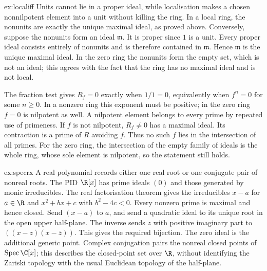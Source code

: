 \begin{solution}{ex:localiff}
\idea Units cannot lie in a proper ideal, while localisation makes a chosen nonnilpotent element into a unit without killing the ring.
\writeup In a local ring, the nonunits are exactly the unique maximal ideal, as proved above. Conversely, suppose the nonunits form an ideal $\mathfrak m$. It is proper since $1$ is a unit. Every proper ideal consists entirely of nonunits and is therefore contained in $\mathfrak m$. Hence $\mathfrak m$ is the unique maximal ideal. In the zero ring the nonunits form the empty set, which is not an ideal; this agrees with the fact that the ring has no maximal ideal and is not local.

The fraction test gives $R_f=0$ exactly when $1/1=0$, equivalently when $f^n=0$ for some $n\ge0$. In a nonzero ring this exponent must be positive; in the zero ring $f=0$ is nilpotent as well. A nilpotent element belongs to every prime by repeated use of primeness. If $f$ is not nilpotent, $R_f\ne0$ has a maximal ideal. Its contraction is a prime of $R$ avoiding $f$. Thus no such $f$ lies in the intersection of all primes. For the zero ring, the intersection of the empty family of ideals is the whole ring, whose sole element is nilpotent, so the statement still holds.
\end{solution}

\begin{solution}{ex:specrx}
\idea A real polynomial records either one real root or one conjugate pair of nonreal roots.
\writeup The PID $\R[x]$ has prime ideals $(0)$ and those generated by monic irreducibles. The real factorisation theorem gives the irreducibles $x-a$ for $a\in\R$ and $x^2+bx+c$ with $b^2-4c<0$. Every nonzero prime is maximal and hence closed. Send $(x-a)$ to $a$, and send a quadratic ideal to its unique root in the open upper half-plane. The inverse sends $z$ with positive imaginary part to $((x-z)(x-\bar z))$. This gives the required bijection. The zero ideal is the additional generic point. Complex conjugation pairs the nonreal closed points of $\operatorname{Spec}\C[x]$; this describes the closed-point set over $\R$, without identifying the Zariski topology with the usual Euclidean topology of the half-plane.
\end{solution}

